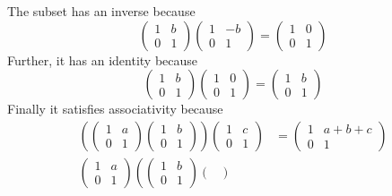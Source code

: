 \documentclass[12pt]{article}
\begin{document}
\begin{enumerate}[label=(\alph*)]
    \color{blue}
    The subset has an inverse because 
    \[\begin{pmatrix}
        1 & b\\
        0 & 1
    \end{pmatrix} \begin{pmatrix}
        1 & -b\\
        0 & 1
    \end{pmatrix} = \begin{pmatrix}
        1 & 0\\
        0 & 1
    \end{pmatrix}\] 
    Further, it has an identity because 
    \[\begin{pmatrix}
        1 & b\\
        0 & 1
    \end{pmatrix} \begin{pmatrix}
        1 & 0\\
        0 & 1
    \end{pmatrix} = \begin{pmatrix}
        1 & b\\
        0 & 1
    \end{pmatrix}\] 
    Finally it satisfies associativity because
    \begin{align*}
        \left(\begin{pmatrix}
            1 & a\\
            0 & 1
        \end{pmatrix} \begin{pmatrix}
            1 & b\\
            0 & 1
        \end{pmatrix}\right) \begin{pmatrix}
            1 & c\\
            0 & 1
        \end{pmatrix} &= \begin{pmatrix}
            1 & a + b + c\\
            0 & 1
        \end{pmatrix}\\
        \begin{pmatrix}
            1 & a\\
            0 & 1
        \end{pmatrix} \left(\begin{pmatrix}
            1 & b\\
            0 & 1
        \end{pmatrix} \begin{pmatrix}

\end{pmatrix}
\end{align*}
\end{enumerate}
\end{document}
